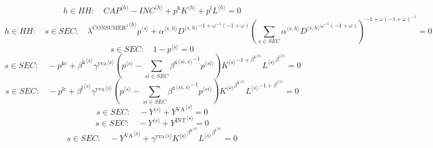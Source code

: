 \begin{equation}
h\in {H\!H}\colon\quad {{C\!A\!P}}^{\langle h\rangle} - {{I\!N\!C}}^{\langle h\rangle} + {p^{\mathrm{k}}} {{K}^{\langle h\rangle}} + {p^{\mathrm{l}}} {{L}^{\langle h\rangle}} = 0
\end{equation}
\begin{equation}
h\in {H\!H}\colon\quad s\in {S\!E\!C}\colon\quad {{\lambda^{\mathrm{CONSUMER}^{\mathrm{1}}}}^{\langle h\rangle}} {{p}^{\langle s\rangle}} + {{\alpha}^{\langle s,h\rangle}} {{{D}^{\langle s,h\rangle}}^{-1 + {\omega}^{-1} \left(-1 + \omega\right)}} {\left(\sum_{s\in {S\!E\!C}} {{\alpha}^{\langle s,h\rangle}} {{{D}^{\langle s,h\rangle}}^{{\omega}^{-1} \left(-1 + \omega\right)}}\right)^{-1 + {\omega} \left(-1 + \omega\right)^{-1}}} = 0
\end{equation}
\begin{equation}
s\in {S\!E\!C}\colon\quad 1 - {p}^{\langle s\rangle} = 0
\end{equation}
\begin{equation}
s\in {S\!E\!C}\colon\quad -p^{\mathrm{kc}} + {{\beta^{\mathrm{k}}}^{\langle s\rangle}} {{\gamma^{\mathrm{yva}}}^{\langle s\rangle}} \left({p}^{\langle s\rangle} - \sum_{{s\!i}\in {S\!E\!C}} {{\beta^{\mathrm{x}}}^{\langle {s\!i},s\rangle}}^{-1} {{p}^{\langle {s\!i}\rangle}}\right) {{{K}^{\langle s\rangle}}^{-1 + {\beta^{\mathrm{k}}}^{\langle s\rangle}}} {{{L}^{\langle s\rangle}}^{{\beta^{\mathrm{l}}}^{\langle s\rangle}}} = 0
\end{equation}
\begin{equation}
s\in {S\!E\!C}\colon\quad -p^{\mathrm{lc}} + {{\beta^{\mathrm{l}}}^{\langle s\rangle}} {{\gamma^{\mathrm{yva}}}^{\langle s\rangle}} \left({p}^{\langle s\rangle} - \sum_{{s\!i}\in {S\!E\!C}} {{\beta^{\mathrm{x}}}^{\langle {s\!i},s\rangle}}^{-1} {{p}^{\langle {s\!i}\rangle}}\right) {{{K}^{\langle s\rangle}}^{{\beta^{\mathrm{k}}}^{\langle s\rangle}}} {{{L}^{\langle s\rangle}}^{-1 + {\beta^{\mathrm{l}}}^{\langle s\rangle}}} = 0
\end{equation}
\begin{equation}
s\in {S\!E\!C}\colon\quad -{Y}^{\langle s\rangle} + {Y^{\mathrm{VA}}}^{\langle s\rangle} = 0
\end{equation}
\begin{equation}
s\in {S\!E\!C}\colon\quad -{Y}^{\langle s\rangle} + {Y^{\mathrm{INT}}}^{\langle s\rangle} = 0
\end{equation}
\begin{equation}
s\in {S\!E\!C}\colon\quad -{Y^{\mathrm{VA}}}^{\langle s\rangle} + {{\gamma^{\mathrm{yva}}}^{\langle s\rangle}} {{{K}^{\langle s\rangle}}^{{\beta^{\mathrm{k}}}^{\langle s\rangle}}} {{{L}^{\langle s\rangle}}^{{\beta^{\mathrm{l}}}^{\langle s\rangle}}} = 0
\end{equation}
